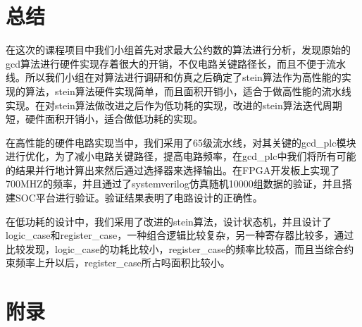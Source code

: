 \documentclass[12pt]{article}
\begin{document}
\section{总结}
在这次的课程项目中我们小组首先对求最大公约数的算法进行分析，发现原始的gcd算法进行硬件实现存着很大的开销，不仅电路关键路径长，而且不便于流水线。所以我们小组在对算法进行调研和仿真之后确定了stein算法作为高性能的实现的算法，stein算法硬件实现简单，而且面积开销小，适合于做高性能的流水线实现。在对stein算法做改进之后作为低功耗的实现，改进的stein算法迭代周期短，硬件面积开销小，适合做低功耗的实现。

在高性能的硬件电路实现当中，我们采用了65级流水线，对其关键的gcd\_plc模块进行优化，为了减小电路关键路径，提高电路频率，在gcd\_plc中我们将所有可能的结果并行地计算出来然后通过选择器来选择输出。在FPGA开发板上实现了700MHZ的频率，并且通过了systemverilog仿真随机10000组数据的验证，并且搭建SOC平台进行验证。验证结果表明了电路设计的正确性。

在低功耗的设计中，我们采用了改进的stein算法，设计状态机，并且设计了logic\_case和register\_case，一种组合逻辑比较复杂，另一种寄存器比较多，通过比较发现，logic\_case的功耗比较小，register\_case的频率比较高，而且当综合约束频率上升以后，register\_case所占吗面积比较小。
\section{附录}
\end{document}
